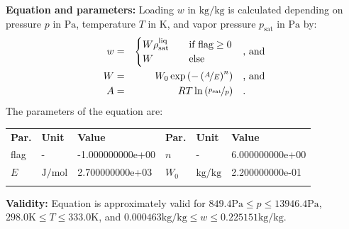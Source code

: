 \textbf{Equation and parameters:}
\newline
%
Loading $w$ in $\si{\kilogram\per\kilogram}$ is calculated depending on pressure $p$ in $\si{\pascal}$, temperature $T$ in $\si{\kelvin}$, and vapor pressure $p_\mathrm{sat}$ in $\si{\pascal}$ by:
%
\begin{equation*}
\begin{split}
w &=& \begin{cases} W \rho_\mathrm{sat}^{\mathrm{liq}} & \quad \text{if flag} \geq 0 \\ W & \quad \text{else} \end{cases} & \quad\text{, and} \\
W &=& W_0 \exp \left( - \left( \nicefrac{A}{E} \right) ^{n} \right) & \quad\text{, and} \\
A &=& R T \ln \left( \nicefrac{p_\mathrm{sat}}{p} \right) & \quad\text{.} \\
\end{split}
\end{equation*}
%
The parameters of the equation are:
%
\begin{longtable}[l]{lll|lll}
\toprule
\addlinespace
\textbf{Par.} & \textbf{Unit} & \textbf{Value} &	\textbf{Par.} & \textbf{Unit} & \textbf{Value} \\
\addlinespace
\midrule
\endhead

\bottomrule
\endfoot
\bottomrule
\endlastfoot
\addlinespace

flag & - & -1.000000000e+00 & $n$ & - & 6.000000000e+00 \\
$E$ & $\si{\joule\per\mole}$ & 2.700000000e+03 & $W_0$ & $\si{\kilogram\per\kilogram}$ & 2.200000000e-01 \\

\addlinespace\end{longtable}

\textbf{Validity:}
\newline
Equation is approximately valid for $849.4 \si{\pascal} \leq p \leq 13946.4 \si{\pascal}$,  $298.0 \si{\kelvin} \leq T \leq 333.0 \si{\kelvin}$, and $0.000463 \si{\kilogram\per\kilogram} \leq w \leq 0.225151 \si{\kilogram\per\kilogram}$.
\newline

